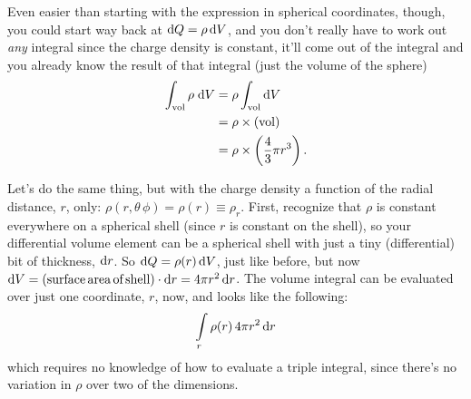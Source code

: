 \documentclass[10pt,letterpaper,twoside]{article}
\begin{document}
Even easier than starting with the expression in spherical coordinates, though, you could start way back at $\text d Q = \rho \, \text d V$, and you don't really have to work out \textit{any} integral since the charge density is constant, it'll come out of the integral and you already know the result of that integral (just the volume of the sphere)
\begin{align*}
  \int_{\text{vol}} \rho\;\text d V &= \rho \int_{\text{vol}} \text d V \\
  &= \rho\times (\text{vol}) \\
  &= \rho \times \left( \frac{4}{3}\pi r^3 \right).
\end{align*}

Let's do the same thing, but with the charge density a function of the radial distance, $r$, only: $\rho(r,\theta\,\phi)=\rho(r)\equiv\rho_r$.
First, recognize that $\rho$ is constant everywhere on a spherical shell (since $r$ is constant on the shell), so your differential volume element can be a spherical shell with just a tiny (differential) bit of thickness, $\text dr$.
So $\text dQ = \rho(r)\,\text d V$, just like before, but now $\text dV=(\text{surface\,area\,of\,shell})\cdot \text dr = 4\pi r^2\,\text d r$.
The volume integral can be evaluated over just one coordinate, $r$, now, and looks like the following:
\begin{align*}
	\int\limits_{r} \rho(r) \,4\pi r^2\,\text d r
\end{align*}
which requires no knowledge of how to evaluate a triple integral, since there's no variation in $\rho$ over two of the dimensions.
\end{document}
